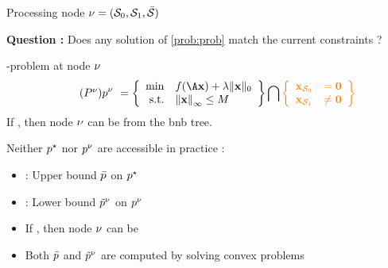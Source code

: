 \documentclass[10pt]{beamer}
\begin{document}
\begin{frame}{Processing node $\nu = (\mathcal{S}_0,\mathcal{S}_1,\bar{\mathcal{S}})$}

  \textbf{Question :} Does any solution of \eqref{prob:prob} match the current constraints ? 

  \pause
  \vspace{0.2cm}

  \begin{block}{-problem at node $\nu$}
    \begin{equation}
      \label{prob:prob-node} \tag{\(\node{\mpb}\)}
      \node{\pobj} \ =
      \left\{
      \begin{array}{rl}
        \min & \datafunc(\dic\pv) + \reg \norm{\pv}{0}\\
        \text{s.t.} & \kvvbar{\pv}_{\infty} \leq \bigM
      \end{array}
      \right\}
      \bigcap
      \emphone{
      \left\{
      \begin{array}{rl}
        \subzero{\pv} &= \0 \\
        \subone{\pv} &\neq \0
      \end{array}
      \right\}
      }
    \end{equation}
    If \emphone{$\opt{\pobj} < \node{\pobj}$}, then node $\nu$ can be  from the \gls{bnb} tree.
  \end{block}

  \pause
  Neither $p^{\star}$ nor $p^{\nu}$ are accessible in practice :
  \pause
  \begin{itemize}
    \item {} : Upper bound $\bar{p}$ on $p^{\star}$ \\
    \pause
    \item {} : Lower bound $\tilde{p}^{\nu}$ on $p^{\nu}$ \\
    \pause
    \item If \emphone{$\UB{\pobj} < \node{\robj}$}, then node $\nu$ can be 
    \pause 
    \item Both $\bar{p}$ and $\tilde{p}^{\nu}$ are computed by solving convex problems
  \end{itemize}

  \pause
  \begin{center}
    
  \end{center}

\end{frame}
\end{document}
